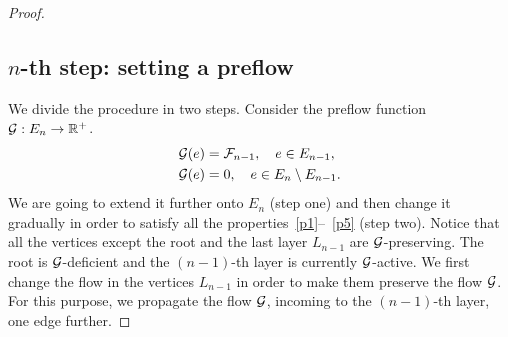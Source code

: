\documentclass[12pt,oneside,a4paper]{amsart}
\begin{document}
\begin{proof}
      \subsection{$n$-th step: setting a preflow}
        We divide the procedure in two steps.
        Consider the preflow function $\cal{G}: E_n \to \mathbb{R}^{+}$.
        \begin{align*}
          &\cal{G}(e) = \flowposn{n-1}, \quad e \in E_{n-1},\\
          &\cal{G}(e) = 0, \quad e \in E_n \setminus E_{n-1}.
        \end{align*}
        We are going to extend it further onto $E_n$ (step one) and then change it gradually in order
          to satisfy all the properties~\ref{p1}--~\ref{p5} (step two).
        Notice that all the vertices except the root and the last layer $L_{n-1}$ are $\cal{G}$-preserving.
        The root is $\cal{G}$-deficient and the $(n-1)$-th layer is currently $\cal{G}$-active.
        We first change the flow in the vertices $L_{n-1}$ in order to make them preserve the flow $\cal{G}$.
        For this purpose, we propagate the flow $\cal{G}$, incoming to the $(n-1)$-th layer, one edge further.


\end{proof}
\end{document}
